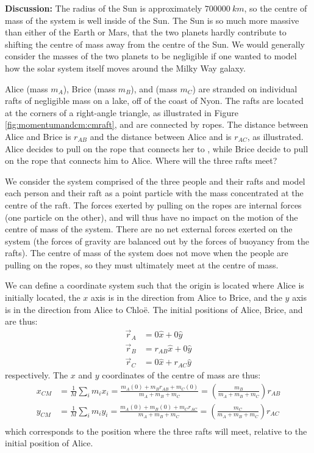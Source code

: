 \begin{example}
\textbf{Discussion:} The radius of the Sun is approximately $\SI{700000}{km}$, so the centre of mass of the system is well inside of the Sun. The Sun is so much more massive than either of the Earth or Mars, that the two planets hardly contribute to shifting the centre of mass away from the centre of the Sun. We would generally consider the masses of the two planets to be negligible if one wanted to model how the solar system itself moves around the Milky Way galaxy.
\end{example}
\newpage
\begin{example}{
Alice (mass $m_A$), Brice (mass $m_B$), and \chloe (mass $m_C$) are stranded on individual rafts of negligible mass on a lake, off of the coast of Nyon. The rafts are located at the corners of a right-angle triangle, as illustrated in Figure \ref{fig:momentumandcm:cmraft}, and are connected by ropes. The distance between Alice and Brice is $r_{AB}$ and the distance between Alice and \chloe is $r_{AC}$, as illustrated. Alice decides to pull on the rope that connects her to \chloe, while Brice decide to pull on the rope that connects him to Alice. Where will the three rafts meet?}

We consider the system comprised of the three people and their rafts and model each person and their raft as a point particle with the mass concentrated at the centre of the raft. The forces exerted by pulling on the ropes are internal forces (one particle on the other), and will thus have no impact on the motion of the centre of mass of the system. There are no net external forces exerted on the system (the forces of gravity are balanced out by the forces of buoyancy from the rafts). The centre of mass of the system does not move when the people are pulling on the ropes, so they must ultimately meet at the centre of mass.

We can define a coordinate system such that the origin is located where Alice is initially located, the $x$ axis is in the direction from Alice to Brice, and the $y$ axis is in the direction from Alice to Chlo\"e. The initial positions of Alice, Brice, and \chloe are thus:
\begin{align*}
\vec r_A &= 0\hat x + 0\hat y\\
\vec r_B &= r_{AB}\hat x + 0\hat y\\
\vec r_C &= 0\hat x + r_{AC}\hat y
\end{align*}
respectively. The $x$ and $y$ coordinates of the centre of mass are thus:
\begin{align*}
x_{CM} &= \frac{1}{M}\sum_i m_i x_i = \frac{m_A(0) + m_Br_{AB} + m_C(0)}{m_A + m_B + m_C}=\left(\frac{m_B}{m_A + m_B + m_C}\right)r_{AB}\\
y_{CM} &= \frac{1}{M}\sum_i m_i y_i = \frac{m_A(0) + m_B(0) + m_Cr_{AC}}{m_A + m_B + m_C}=\left(\frac{m_C}{m_A + m_B + m_C}\right)r_{AC}\\
\end{align*}
which corresponds to the position where the three rafts will meet, relative to the initial position of Alice.


\end{example}
